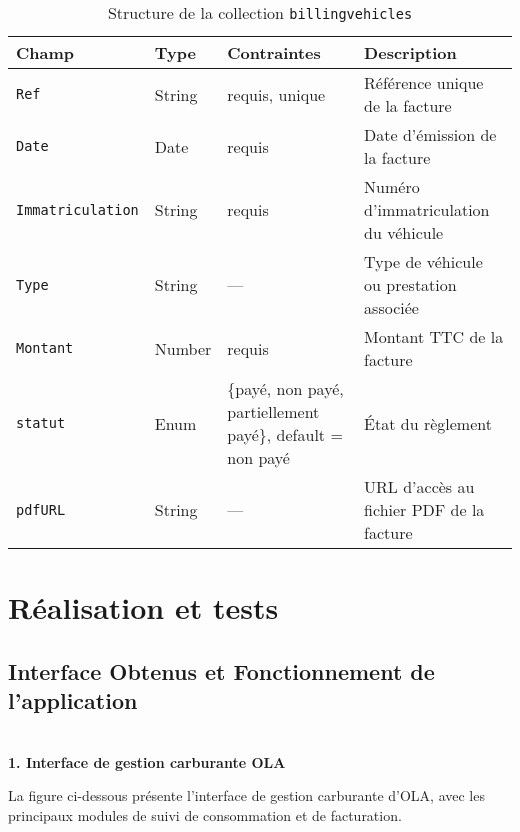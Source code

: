 \documentclass[a4paper,11pt]{report}
\begin{document}
\begin{table}[ht]
  \centering
  \small
  \caption{Structure de la collection \texttt{billingvehicles}}
  \label{tab:billingvehicles-schema}
  \begin{tabularx}{\textwidth}{l X >{\raggedright\arraybackslash}p{3cm} X}
    \toprule
    \bf Champ            & \bf Type    & \bf Contraintes                   & \bf Description                           \\
    \midrule
    \texttt{Ref}            & String     & requis, unique                   & Référence unique de la facture            \\
    \addlinespace
    \texttt{Date}           & Date       & requis                           & Date d’émission de la facture             \\
    \addlinespace
    \texttt{Immatriculation}& String     & requis                           & Numéro d’immatriculation du véhicule      \\
    \addlinespace
    \texttt{Type}           & String     & —                                & Type de véhicule ou prestation associée   \\
    \addlinespace
    \texttt{Montant}        & Number     & requis                           & Montant TTC de la facture                 \\
    \addlinespace
    \texttt{statut}         & Enum       & \{payé, non payé, partiellement payé\}, default = non payé
                                   & État du règlement                         \\
    \addlinespace
    \texttt{pdfURL}         & String     & —                                & URL d’accès au fichier PDF de la facture  \\
    \bottomrule
  \end{tabularx}
\end{table}


\newpage
\section{Réalisation et tests }
\subsection{Interface Obtenus et Fonctionnement de l'application}

\textbf{      \\ 1. Interface de gestion carburante OLA}

La figure ci-dessous présente l’interface de gestion carburante d’OLA, avec les principaux modules de suivi de consommation et de facturation.
\end{document}
